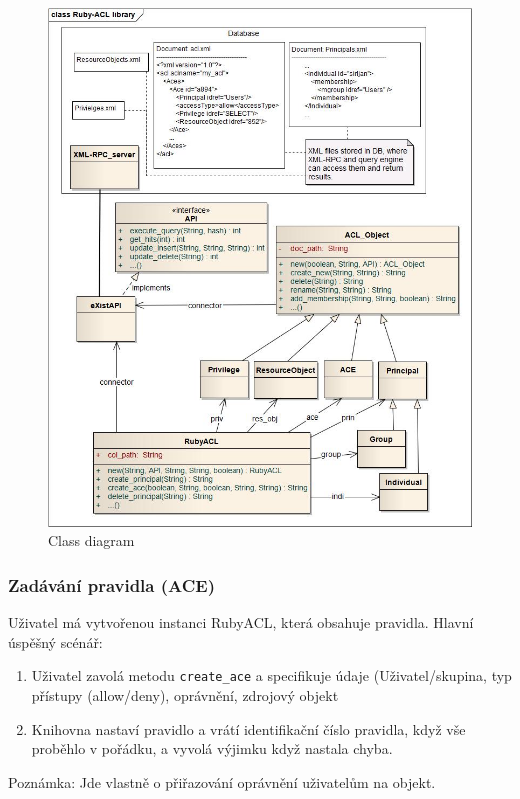 \begin{figure}
\includegraphics[width=15cm]{Ruby-ACL.jpg}
\caption{Class diagram}
\label{fig:Class diagram}
\end{figure}


\subsubsection{Zadávání pravidla (ACE)}
Uživatel má vytvořenou instanci RubyACL, která obsahuje pravidla.
Hlavní úspěšný scénář:
\begin{enumerate}
\item Uživatel zavolá metodu \verb|create_ace| a specifikuje údaje (Uživatel/skupina, typ přístupy (allow/deny), oprávnění, zdrojový objekt
\item Knihovna nastaví pravidlo a vrátí identifikační číslo pravidla, když vše proběhlo v pořádku, a vyvolá výjimku když nastala chyba.
\end{enumerate}
Poznámka: Jde vlastně o přiřazování oprávnění uživatelům na objekt.

